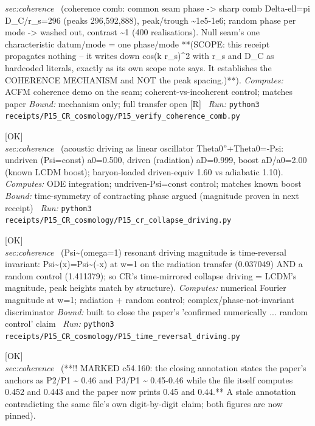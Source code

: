 \begin{description}
\textit{sec:coherence} \ (coherence comb: common seam phase -> sharp comb Delta-ell=pi D\_C/r\_s=296 (peaks 296,592,888), peak/trough \textasciitilde{}1e5-1e6; random phase per mode -> washed out, contrast \textasciitilde{}1 (400 realisations). Null seam's one characteristic datum/mode = one phase/mode **(SCOPE: this receipt propagates nothing -- it writes down cos(k r\_s)\textasciicircum{}2 with r\_s and D\_C as hardcoded literals, exactly as its own scope note says. It establishes the COHERENCE MECHANISM and NOT the peak spacing.)**). 
\emph{Computes:} ACFM coherence demo on the seam; coherent-vs-incoherent control; matches paper
 \emph{Bound:} mechanism only; full transfer open [R]
\ \emph{Run:} \texttt{python3 receipts/P15\_CR\_cosmology/P15\_verify\_coherence\_comb.py}
\item[\label{rcpt:P15_cr_collapse_driving}\texttt{P15\_cr\_collapse\_driving}]\hfill\textsf{[OK]}\\
\textit{sec:coherence} \ (acoustic driving as linear oscillator Theta0''+Theta0=-Psi: undriven (Psi=const) a0=0.500, driven (radiation) aD=0.999, boost aD/a0=2.00 (known LCDM boost); baryon-loaded driven-equiv 1.60 vs adiabatic 1.10). 
\emph{Computes:} ODE integration; undriven-Psi=const control; matches known boost
 \emph{Bound:} time-symmetry of contracting phase argued (magnitude proven in next receipt)
\ \emph{Run:} \texttt{python3 receipts/P15\_CR\_cosmology/P15\_cr\_collapse\_driving.py}
\item[\label{rcpt:P15_time_reversal_driving}\texttt{P15\_time\_reversal\_driving}]\hfill\textsf{[OK]}\\
\textit{sec:coherence} \ (\textbar{}Psi\textasciitilde{}(omega=1)\textbar{} resonant driving magnitude is time-reversal invariant: \textbar{}Psi\textasciitilde{}(x)\textbar{}=\textbar{}Psi\textasciitilde{}(-x)\textbar{} at w=1 on the radiation transfer (0.037049) AND a random control (1.411379); so CR's time-mirrored collapse driving = LCDM's magnitude, peak heights match by structure). 
\emph{Computes:} numerical Fourier magnitude at w=1; radiation + random control; complex/phase-not-invariant discriminator
 \emph{Bound:} built to close the paper's 'confirmed numerically ... random control' claim
\ \emph{Run:} \texttt{python3 receipts/P15\_CR\_cosmology/P15\_time\_reversal\_driving.py}
\item[\label{rcpt:P15_camb_reference}\texttt{P15\_camb\_reference}]\hfill\textsf{[OK]}\\
\textit{sec:coherence} \ (**!! MARKED c54.160: the closing annotation states the paper's anchors as P2/P1 \textasciitilde{} 0.46 and P3/P1 \textasciitilde{} 0.45-0.46 while the file itself computes 0.452 and 0.443 and the paper now prints 0.45 and 0.44.** A stale annotation contradicting the same file's own digit-by-digit claim; both figures are now pinned). 

\end{description}
